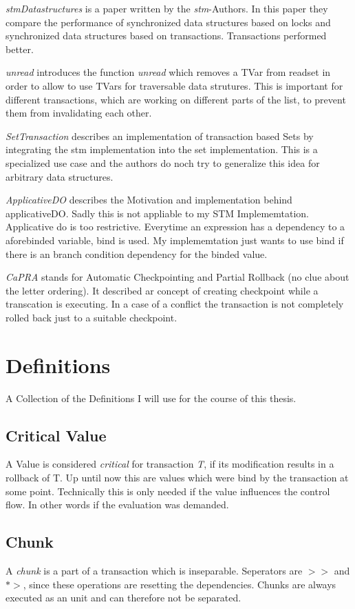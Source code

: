 \documentclass[a4paper,10pt]{article}
\begin{document}
\textit{stmDatastructures} is a paper written by the \textit{stm}-Authors. In this paper they compare the
performance of synchronized data structures based on locks and synchronized data structures based on transactions.
Transactions performed better.

\textit{unread} introduces the function \textit{unread} which removes a TVar from readset in order to allow to 
use TVars for traversable data strutures. This is important for different transactions, which are working on
different parts of the list, to prevent them from invalidating each other.

\textit{SetTransaction} describes an implementation of transaction based Sets by integrating the stm implementation
into the set implementation. This is a specialized use case and the authors do noch try to generalize this idea for
arbitrary data structures.

\textit{ApplicativeDO} describes the Motivation and implementation behind applicativeDO. Sadly this is not appliable
to my STM Implememtation. Applicative do is too restrictive. Everytime an expression has a dependency to a aforebinded
variable, bind is used. My implememtation just wants to use bind if there is an branch condition dependency for 
the binded value.

\textit{CaPRA} stands for Automatic Checkpointing and Partial Rollback (no clue about the letter ordering). It described 
ar concept of creating checkpoint while a transcation is executing. In a case of a conflict the transaction is not 
completely rolled back just to a suitable checkpoint.

\section{Definitions}
A Collection of the Definitions I will use for the course of this thesis.
\subsection{Critical Value}
A Value is considered \textit{critical} for transaction \textit{T}, if its modification results in a rollback of T.
Up until now this are values which were bind by the transaction at some point. Technically this is only needed if 
the value influences the control flow. In other words if the evaluation was demanded.
\subsection{Chunk}
A \textit{chunk} is a part of a transaction which is inseparable. Seperators are $>>$ and $*>$, since 
these operations are resetting the dependencies. Chunks are always executed as an unit and can therefore not be
separated.
\end{document}
